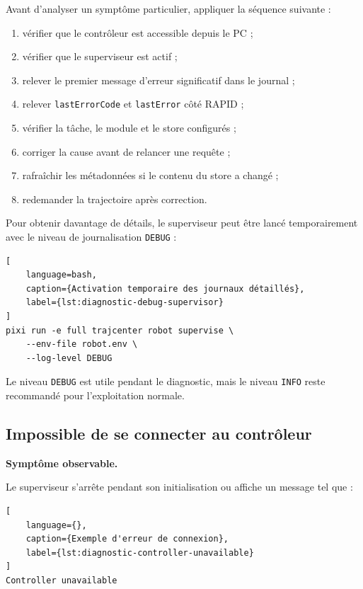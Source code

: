 \documentclass{rapportENSAM}
\begin{document}
Avant d'analyser un symptôme particulier, appliquer la séquence suivante :

\begin{enumerate}
    \item vérifier que le contrôleur est accessible depuis le PC ;
    \item vérifier que le superviseur est actif ;
    \item relever le premier message d'erreur significatif dans le journal ;
    \item relever \texttt{lastErrorCode} et \texttt{lastError} côté RAPID ;
    \item vérifier la tâche, le module et le store configurés ;
    \item corriger la cause avant de relancer une requête ;
    \item rafraîchir les métadonnées si le contenu du store a changé ;
    \item redemander la trajectoire après correction.
\end{enumerate}

Pour obtenir davantage de détails, le superviseur peut être lancé
temporairement avec le niveau de journalisation \texttt{DEBUG} :

\begin{lstlisting}[
    language=bash,
    caption={Activation temporaire des journaux détaillés},
    label={lst:diagnostic-debug-supervisor}
]
pixi run -e full trajcenter robot supervise \
    --env-file robot.env \
    --log-level DEBUG
\end{lstlisting}

Le niveau \texttt{DEBUG} est utile pendant le diagnostic, mais le niveau
\texttt{INFO} reste recommandé pour l'exploitation normale.


\subsection{Impossible de se connecter au contrôleur}
\label{subsec:diagnostic-controller-connection}

\textbf{Symptôme observable.}

Le superviseur s'arrête pendant son initialisation ou affiche un message tel
que :

\begin{lstlisting}[
    language={},
    caption={Exemple d'erreur de connexion},
    label={lst:diagnostic-controller-unavailable}
]
Controller unavailable
\end{lstlisting}
\end{document}
